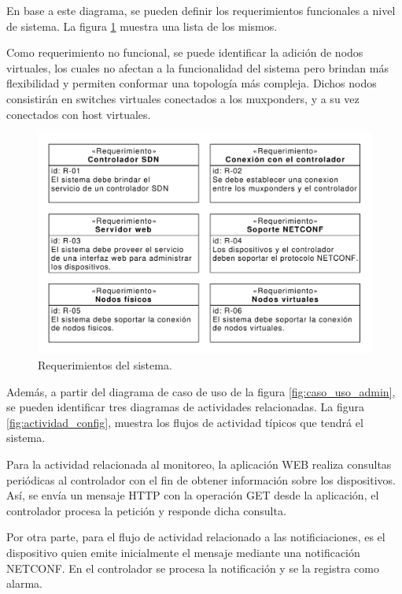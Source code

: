   En base a este diagrama, se pueden definir los requerimientos funcionales a nivel de sistema. La figura \ref{fig:req_sys} muestra una lista de los mismos. 
  
  Como requerimiento no funcional, se puede identificar la adición de nodos virtuales, los cuales no afectan a la funcionalidad del sistema pero brindan más flexibilidad y permiten conformar una topología más compleja. Dichos nodos consistirán en switches virtuales conectados a los muxponders, y a su vez conectados con host virtuales.

  \begin{figure}[H]
    \centering
    \includegraphics[scale=0.65]{Figures/req_sys.pdf}
    \caption{Requerimientos del sistema.}
    \label{fig:req_sys}
  \end{figure}


  Además, a partir del diagrama de caso de uso de la figura \ref{fig:caso_uso_admin}, se pueden identificar tres diagramas de actividades relacionadas. La figura \ref{fig:actividad_config}, muestra los flujos de actividad típicos que tendrá el sistema. 
  
  Para la actividad relacionada al monitoreo, la aplicación WEB realiza consultas periódicas al controlador con el fin de obtener información sobre los dispositivos. Así, se envía un mensaje HTTP con la operación GET desde la aplicación, el controlador procesa la petición y responde dicha consulta.

Por otra parte, para el flujo de actividad relacionado a las notificiaciones, es el dispositivo quien emite inicialmente el mensaje mediante una notificación NETCONF. En el controlador se procesa la notificación y se la registra como alarma.

